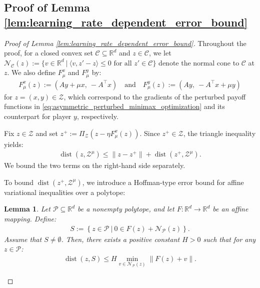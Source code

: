 \documentclass{article}
\DeclareMathOperator{\dist}{dist}
\newcommand{\R}{\mathbb{R}}
\newcommand{\Z}{\mathcal{Z}}
\theoremstyle{plain}
\newtheorem{lemma}[theorem]{Lemma}
\begin{document}
\subsection{Proof of Lemma \ref{lem:learning_rate_dependent_error_bound}}
\begin{proof}[Proof of Lemma \ref{lem:learning_rate_dependent_error_bound}]
    Throughout the proof, for a closed convex set $\mathcal{C}\subseteq \R^d$ and $z\in \mathcal{C}$, we let $\mathcal{N}_{\mathcal{C}}(z):= \{ v \in \R^d ~|~ \langle v, z' - z \rangle \leq 0 \text{ for all } z' \in \mathcal{C} \}$ denote the normal cone to $\mathcal{C}$ at $z$.
    We also define $F_{\mu}^x$ and $F_{\mu}^y$ by:
    \begin{align*}
        F_{\mu}^x(z) := \left(Ay + \mu x,~ -A^{\top}x\right) \quad \text{and} \quad F_{\mu}^y(z) := \left(Ay,~ -A^{\top}x + \mu y\right)
    \end{align*}
    for $z = (x, y)\in \Z$, which correspond to the gradients of the perturbed payoff functions in \eqref{eq:asymmetric_perturbed_minimax_optimization} and its counterpart for player $y$, respectively.

    Fix $z\in \Z$ and set $z^+ := \Pi_{\Z}\left(z - \eta F_{\mu}^x(z)\right)$.
    Since $z^+\in \Z$, the triangle inequality yields:
    \begin{align}
        \dist(z, \Z^{\mu}) \leq \|z - z^+\| + \dist(z^+, \Z^{\mu}).
        \label{eq:dist_triangle_inequality}
    \end{align}
    We bound the two terms on the right-hand side separately.

    To bound $\dist(z^+, \Z^{\mu})$, we introduce a Hoffman-type error bound for affine variational inequalities over a polytope:
    \begin{lemma}
        Let $\mathcal{P}\subseteq \R^d$ be a nonempty polytope, and let $F:\R^d \to \R^d$ be an affine mapping.
        Define:
        \begin{align*}
            S := \left\{z\in \mathcal{P} ~|~ 0\in F(z) + \mathcal{N}_{\mathcal{P}}(z)\right\}.
        \end{align*}
        Assume that $S\neq \emptyset$. Then, there exists a positive constant $H > 0$ such that for any $z\in \mathcal{P}$:
        \begin{align*}
            \dist(z, S) \leq H \min_{v\in \mathcal{N}_{\mathcal{P}}(z)}\left\|F(z) + v\right\|.
        \end{align*}
        \label{lem:hoffman_bound_for_vi}
    \end{lemma}


\end{proof}
\end{document}
